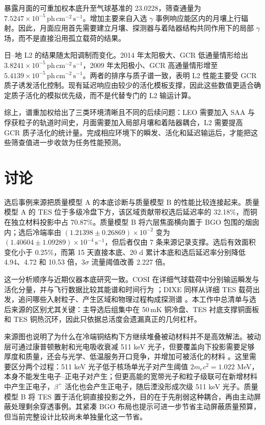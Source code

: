 \documentclass[11pt]{article}
\newcommand{\phcms}{\,\mathrm{ph\,cm^{-2}\,s^{-1}}}
\newcommand{\cps}{\,\mathrm{s^{-1}}}
\begin{document}
暴露月面的可重加权本底升至气球基准的 23.0228，筛查通量为 $7.5247\times10^{-5}\phcms$。增加主要来自入选 $\gamma$ 事例响应能区内的月壤上行辐射。因此，月面应用首先需要建立月壤、探测器与着陆器结构共同作用下的局部 $\gamma$ 场，而不是直接沿用孤立载荷的结果。

日--地 L2 的结果随太阳调制而变化。2014 年太阳极大、GCR 低通量情形给出 $3.8241\times10^{-5}\phcms$，2009 年太阳极小、GCR 高通量情形增至 $5.4139\times10^{-5}\phcms$。两者的排序与质子谱一致，表明 L2 性能主要受 GCR 质子诱发活化控制。现有延迟响应由较少的活化模板支撑，因此这些数值更适合确定质子活化的模拟优先级，而不是代替专门的 L2 输运计算。

综上，谱重加权给出了三类环境清晰且不同的后续问题：LEO 需要加入 SAA 与俘获粒子的轨道时间史，月面需要加入局部月壤和着陆器耦合，L2 需要提高 GCR 质子活化的统计量。完成相应环境下的瞬发、活化和延迟输运后，才能把这些筛查值进一步收敛为任务性能预测。

\FloatBarrier

\section{讨论}
\label{sec:discussion}

选后事例来源把质量模型 A 的本底诊断与质量模型 B 的性能比较连接起来。质量模型 A 的 TES 位于多级冷盘下方，该区域贡献带权选后延迟率的 32.18\%，而铜在独立材料投影中占 70.87\%。质量模型 B 将六层焦面横向置于 BGO 包围的烟囱内；选后冷端率由 $(1.21398\pm0.26869)\times10^{-2}$ 变为 $(1.40604\pm1.09289)\times10^{-4}\cps$，但后者仅由 7 条来源记录支撑。选后有效面积变化小于 0.25\%，而第 15 天直接本底、20 d 累计本底和选后延迟率分别降低 4.94、4.72 和 10.53 倍，$3\sigma$ 流量阈值改善 2.227 倍。

这一分析顺序与近期仪器本底研究一致。COSI 在详细气球载荷中分别输运瞬发与活化分量，并与飞行数据比较其能谱和时间行为 \cite{Gallego2025Balloon}；DIXE 同样从详细 TES 载荷出发，追问哪些入射粒子、产生区域和物理过程构成探测谱 \cite{Tian2026DIXE}。本工作中总清单与选后来源的区别尤其关键：主导选后组集中在 50\,mK 铜冷盘、TES 衬底支撑铜面板和 TES 铜热沉环，因此只依据总活度会遗漏真正的几何杠杆。

来源图也说明了为什么在冷端铜结构下方继续堆叠被动材料并不是高效解法。被动层可通过康普顿散射和光电吸收衰减 511 keV 光子，但要覆盖向下投影需要足够厚度和质量，还会与光学、低温服务开口竞争，并增加可被活化的材料 \cite{NISTXCOM}。这里需要区分两个过程：511 keV 光子低于核场单光子对产生阈值 $2m_ec^2=1.022$ MeV，本身不能发生电子--正电子对产生；但更高能的宽带光子和粒子级联可在新增材料中产生正电子，$\beta^+$ 活化也会产生正电子，随后湮没形成次级 511 keV 光子。质量模型 B 将 TES 置于活化铜直接投影之外，目的在于先削弱这种耦合，再由主动屏蔽处理剩余穿透事例。其紧凑 BGO 布局也提示可进一步节省主动屏蔽质量预算，但当前完整设计比较尚未单独量化这一节省。
\end{document}
